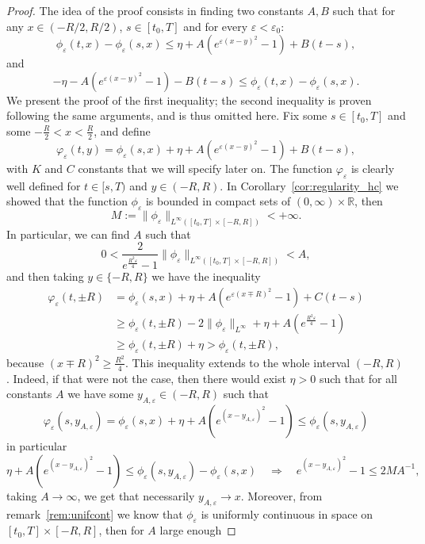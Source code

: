 \documentclass[onefignum,onetabnum]{siamart190516}
\newcommand{\R}{\mathbb{R}}
\newcommand{\1}{\mathbbm{1}}
\newcommand{\eps}{\varepsilon}
\begin{document}
\begin{proof}
The idea of the proof consists in finding two constants $A,B$ such that for any $x\in(-R/2,R/2)$, $s\in[t_0,T]$ and for every $\eps<\eps_0$:
$$
\phi_\eps(t,x)-\phi_\eps(s,x)\leq \eta+A(e^{\eps(x-y)^2}-1)+B(t-s),
$$
and
$$
-\eta-A(e^{\eps(x-y)^2}-1)-B(t-s)\leq \phi_\eps(t,x)-\phi_\eps(s,x).
$$
We present the proof of the first inequality; the second inequality is proven following the same arguments, and is thus omitted here. Fix some $s\in[t_0,T]$ and some $-\frac R2<x<\frac R2$, and define
 $$
 \varphi_\eps(t,y) = \phi_\eps(s,x)+\eta+A(e^{\eps(x-y)^2}-1)+B(t-s),
 $$
 with $K$ and $C$ constants that we will specify later on. The function $\varphi_\eps$ is clearly well defined for $t\in[s,T)$ and $y\in(-R,R)$. In Corollary~\ref{cor:regularity_hc} we showed that the function $\phi_\eps$ is bounded in compact sets of $(0,\infty)\times\R$, then
 $$
 M:=\|\phi_\eps\|_{L^\infty([t_0,T]\times[-R,R])}<+\infty.
 $$
In particular, we can find $A$ such that
$$
0<\frac{2}{e^{\frac{R^2\eps}{4}} -1}\|\phi_\eps\|_{L^\infty([t_0,T]\times[-R,R])}<A,
$$
and then taking $y\in\{-R,R\}$ we have the inequality
\begin{align*}
\varphi_\eps(t,\pm R) &=  \phi_\eps(s,x)+\eta+A(e^{\eps(x\mp R)^2}-1) +C(t-s)
\\
& \geq  \phi_\eps(t,\pm R) - 2\|\phi_\eps\|_{L^\infty}+\eta
+A(e^{\frac{R^2\eps}{4}} -1)
\\
& \geq  \phi_\eps(t,\pm R) +\eta > \phi_{\eps}(t,\pm R),
\end{align*}
because $(x\mp R)^2\geq\frac{R^2}{4}$. This inequality extends to the whole interval $(-R,R)$. Indeed, if that were not the case, then there would exist $\eta>0$ such that for all constants $A$ we have some $y_{A,\eps}\in(-R,R)$ such that
$$
\varphi_\eps(s,y_{A,\eps}) = \phi_\eps(s,x)+\eta+A(e^{(x-y_{A,\eps})^2}-1) \leq \phi_\eps(s,y_{A,\eps})
$$
in particular
$$ \eta+A(e^{(x-y_{A,\eps})^2}-1)\leq \phi_\eps(s,y_{A,\eps})-\phi_\eps(s,x)\quad\Rightarrow\quad e^{(x-y_{A,\eps})^2}-1\leq 2MA^{-1},
$$
taking $A\rightarrow\infty$, we get that necessarily $y_{A,\eps}\rightarrow x$. Moreover, from remark~\ref{rem:unifcont} we know that $\phi_\eps$ is uniformly continuous in space on $[t_0,T]\times[-R,R]$, then for $A$ large enough

\end{proof}
\end{document}
